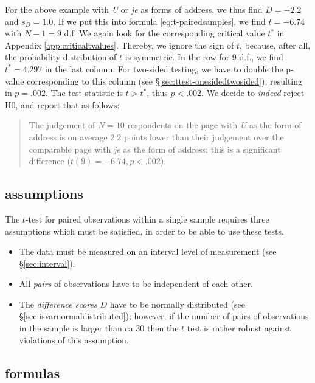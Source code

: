 \documentclass[
]{book}
\begin{document}
For the above example with \emph{U} or \emph{je} as forms of address,
we thus find \(\overline{D}=-2.2\) and \(s_D=1.0\). If we put this into
formula \eqref{eq:t-pairedsamples}, we find \(t=-6.74\) with \(N-1=9\) d.f.
We again look for the corresponding critical value \(t^*\)
in Appendix \ref{app:criticaltvalues}. Thereby, we ignore the sign of \(t\),
because, after all, the probability distribution of \(t\) is symmetric.
In the row for 9 d.f., we find \(t^*=4.297\) in the last column.
For two-sided testing, we have to double the p-value corresponding to this
column (see
§\ref{sec:ttest-onesidedtwosided}), resulting in \(p=.002\).
The test statistic is \(t > t^*\), thus \(p<.002\). We decide to
\emph{indeed} reject H0, and report that as follows:

\begin{quote}
The judgement of \(N=10\) respondents on the page with \emph{U} as the
form of address is on average 2.2 points lower than their judgement
over the comparable page with \emph{je} as the form of address; this is
a significant difference (\(t(9)=-6.74, p<.002\)).
\end{quote}

\hypertarget{assumptions-1}{%
\subsection{assumptions}\label{assumptions-1}}

The \(t\)-test for paired observations within a single sample requires three
assumptions which must be satisfied, in order to be able to use these
tests.

\begin{itemize}
\item
  The data must be measured on an interval level of measurement (see
  §\ref{sec:interval}).
\item
  All \emph{pairs} of observations have to be independent of
  each other.
\item
  The \emph{difference scores} \(D\) have to be normally distributed (see §\ref{sec:isvarnormaldistributed}); however, if the number of pairs of
  observations in the sample is larger than ca 30 then the \(t\) test is rather robust against violations of this assumption.
\end{itemize}

\hypertarget{sec:formulas13-4}{%
\subsection{formulas}\label{sec:formulas13-4}}
\end{document}
